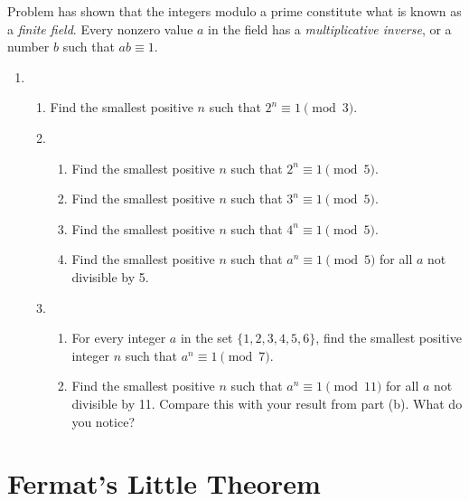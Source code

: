 \documentclass[11pt]{article}
\theoremstyle{definition}
\begin{document}

Problem  has shown that the integers
modulo a prime constitute what is known as a \textit{finite field}. Every nonzero value $a$ in the field has a \textit{multiplicative inverse}, or a number $b$ such that $ab \equiv 1$.

\begin{enumerate}
\addtocounter{enumi}{\value{problem_count}}

\item \addtocounter{problem_count}{1}
\begin{enumerate}
\item Find the smallest positive $n$ such that $2^n \equiv 1 \pmod{3}$.

\item 
\begin{enumerate}
\item Find the smallest positive $n$ such that $2^n \equiv 1 \pmod{5}$.

\item Find the smallest positive $n$ such that $3^n \equiv 1 \pmod{5}$.

\item Find the smallest positive $n$ such that $4^n \equiv 1 \pmod{5}$.

\item Find the smallest positive $n$ such that $a^n \equiv 1 \pmod{5}$ for all $a$ not divisible by 5.

\end{enumerate}
\item
\begin{enumerate}
\item For every integer $a$ in the set $\{1,2,3,4,5,6\}$,
find the smallest positive integer $n$ such that $a^n \equiv 1 \pmod{7}$.

\item Find the smallest positive $n$ such that $a^n \equiv 1 \pmod{11}$ for all $a$ not divisible by 11. Compare this with your result from part (b). What do you notice?

\end{enumerate}
\end{enumerate}

\end{enumerate}

\section{Fermat's Little Theorem}
\end{document}
